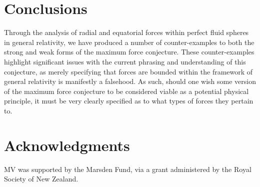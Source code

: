 \documentclass[12pt]{article}
\begin{document}
\section{Conclusions}

Through the analysis of radial and equatorial forces within perfect fluid spheres in general relativity, we have  produced a number of counter-examples to both the strong and weak forms of the maximum force conjecture. These counter-examples highlight significant issues with the current phrasing and understanding of this conjecture, as merely specifying that forces are bounded within the framework of general relativity is manifestly a falsehood. 
As such, should one wish some version of the maximum force conjecture to be considered viable as a potential physical principle, it must be very clearly specified as to what types of forces they pertain to.

\section*{Acknowledgments}
MV was supported by the Marsden Fund, via a grant administered by the Royal Society of New Zealand.
\end{document}
